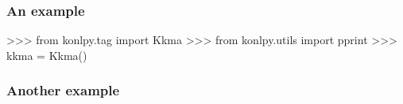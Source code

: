 \documentclass[compress]{beamer}
\begin{document}
\begin{frame}[fragile]\frametitle{An example} %
\begin{pythoncode}
    >>> from konlpy.tag import Kkma
    >>> from konlpy.utils import pprint
    >>> kkma = Kkma()
\end{pythoncode}
\end{frame}

\begin{frame}[fragile]\frametitle{Another example}
\end{frame}
\end{document}
